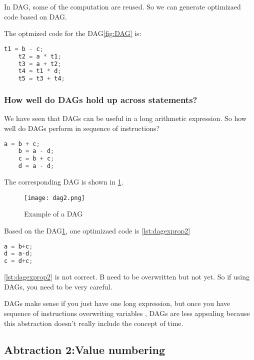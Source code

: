 In DAG, some of the computation are reused. So we can generate optimizaed code based on DAG.

The optmized code for the DAG\ref{fig:DAG} is: 

\begin{lstlisting}[language=C, frame=single,caption=code ,label=lst:dag]
    t1 = b - c;
    t2 = a * t1;
    t3 = a + t2;
    t4 = t1 * d;
    t5 = t3 + t4;
\end{lstlisting}


\subsubsection{How well do DAGs hold up across statements?}

We have seen that DAGs can be useful in a long arithmetic expression. So how well do DAGs
perform in sequence of instructions?

\begin{lstlisting}[language=C, frame=single,caption=code ,label=lst:dagexpr2]
    a = b + c;
    b = a - d;
    c = b + c;
    d = a - d;
\end{lstlisting}


The corresponding DAG is shown in \ref{fig:DAG2}.
\begin{figure}[h]
    \centering
    \texttt{[image: dag2.png]}
    \caption{Example of a DAG}
    \label{fig:DAG2}
\end{figure}

Based on the DAG\ref{fig:DAG2}, one optimizaed code is \ref{lst:dagexprop2}


\begin{lstlisting}[language=C, frame=single,caption=code ,label=lst:dagexprop2]
a = b+c;
d = a-d;
c = d+c;
\end{lstlisting}

\ref{lst:dagexprop2} is not correct. B need to be overwritten but not yet. So if using DAGs, you need to be 
very careful. 

DAGs make sense if you just have one long expression, but once you have sequence of instructions overwriting variables
, DAGs are less appealing because this abstraction doesn't really include the concept of time.




\subsection{Abtraction 2:Value numbering} 


